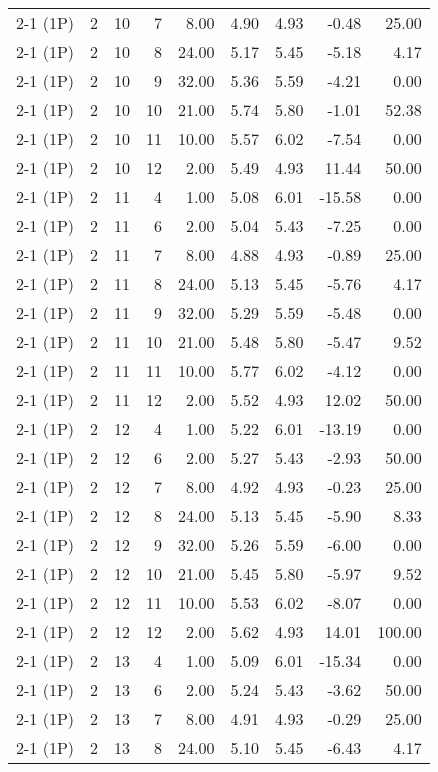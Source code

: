 \begin{tabular}{lrrrrrrrr}
2-1 (1P) & 2 & 10 & 7 & 8.00 & 4.90 & 4.93 & -0.48 & 25.00 \\
2-1 (1P) & 2 & 10 & 8 & 24.00 & 5.17 & 5.45 & -5.18 & 4.17 \\
2-1 (1P) & 2 & 10 & 9 & 32.00 & 5.36 & 5.59 & -4.21 & 0.00 \\
2-1 (1P) & 2 & 10 & 10 & 21.00 & 5.74 & 5.80 & -1.01 & 52.38 \\
2-1 (1P) & 2 & 10 & 11 & 10.00 & 5.57 & 6.02 & -7.54 & 0.00 \\
2-1 (1P) & 2 & 10 & 12 & 2.00 & 5.49 & 4.93 & 11.44 & 50.00 \\
2-1 (1P) & 2 & 11 & 4 & 1.00 & 5.08 & 6.01 & -15.58 & 0.00 \\
2-1 (1P) & 2 & 11 & 6 & 2.00 & 5.04 & 5.43 & -7.25 & 0.00 \\
2-1 (1P) & 2 & 11 & 7 & 8.00 & 4.88 & 4.93 & -0.89 & 25.00 \\
2-1 (1P) & 2 & 11 & 8 & 24.00 & 5.13 & 5.45 & -5.76 & 4.17 \\
2-1 (1P) & 2 & 11 & 9 & 32.00 & 5.29 & 5.59 & -5.48 & 0.00 \\
2-1 (1P) & 2 & 11 & 10 & 21.00 & 5.48 & 5.80 & -5.47 & 9.52 \\
2-1 (1P) & 2 & 11 & 11 & 10.00 & 5.77 & 6.02 & -4.12 & 0.00 \\
2-1 (1P) & 2 & 11 & 12 & 2.00 & 5.52 & 4.93 & 12.02 & 50.00 \\
2-1 (1P) & 2 & 12 & 4 & 1.00 & 5.22 & 6.01 & -13.19 & 0.00 \\
2-1 (1P) & 2 & 12 & 6 & 2.00 & 5.27 & 5.43 & -2.93 & 50.00 \\
2-1 (1P) & 2 & 12 & 7 & 8.00 & 4.92 & 4.93 & -0.23 & 25.00 \\
2-1 (1P) & 2 & 12 & 8 & 24.00 & 5.13 & 5.45 & -5.90 & 8.33 \\
2-1 (1P) & 2 & 12 & 9 & 32.00 & 5.26 & 5.59 & -6.00 & 0.00 \\
2-1 (1P) & 2 & 12 & 10 & 21.00 & 5.45 & 5.80 & -5.97 & 9.52 \\
2-1 (1P) & 2 & 12 & 11 & 10.00 & 5.53 & 6.02 & -8.07 & 0.00 \\
2-1 (1P) & 2 & 12 & 12 & 2.00 & 5.62 & 4.93 & 14.01 & 100.00 \\
2-1 (1P) & 2 & 13 & 4 & 1.00 & 5.09 & 6.01 & -15.34 & 0.00 \\
2-1 (1P) & 2 & 13 & 6 & 2.00 & 5.24 & 5.43 & -3.62 & 50.00 \\
2-1 (1P) & 2 & 13 & 7 & 8.00 & 4.91 & 4.93 & -0.29 & 25.00 \\
2-1 (1P) & 2 & 13 & 8 & 24.00 & 5.10 & 5.45 & -6.43 & 4.17 \\

\end{tabular}
